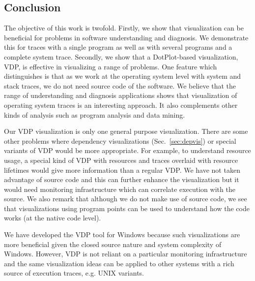 \subsection{Conclusion}
\label{sec:lviz-conclusion}

The objective of this work is twofold.
Firstly, we show that visualization can be beneficial for problems
in software understanding and diagnosis. We demonstrate this
for traces with a single program as well as with
several programs and a complete system trace.
Secondly, we show that a DotPlot-based visualization, VDP, is effective
in visualizing a range of problems.
One feature which distinguishes  is that as we work
at the operating system level with system and stack traces,
we do not need source code of the software.
We believe that the range of understanding and diagnosis applications
shows that visualization of operating system traces is an interesting approach.
It also complements other kinds of analysis such
as program analysis and data mining.

Our VDP visualization is only one general purpose visualization.
There are some other problems where dependency visualizations
(Sec.~\ref{sec:depvis}) or special
variants of VDP would be more appropriate. For example, to understand
resource usage, a special kind of VDP with resources and traces overlaid
with resource lifetimes would give more information than a regular VDP.
We have not taken advantage of source code and this can further enhance
the visualization but it would need monitoring infrastructure which
can correlate execution with the source.
We also remark that although we do not make use of source code, we
see that visualizations using program points can be used to understand
how the code works (at the native code level).

We have developed the VDP tool for Windows because such visualizations
are more beneficial given the closed source nature and system complexity
of Windows.
However, VDP is not reliant on a particular monitoring
infrastructure and the same visualization ideas can be applied
to other systems with a rich source of execution traces, e.g. UNIX variants.
